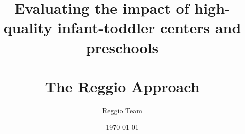 



\title{Evaluating the impact of high-quality infant-toddler centers and preschools  \protect\\ \protect~\\ The Reggio Approach}
\author{Reggio Team}
\date{\today}

\maketitle






















